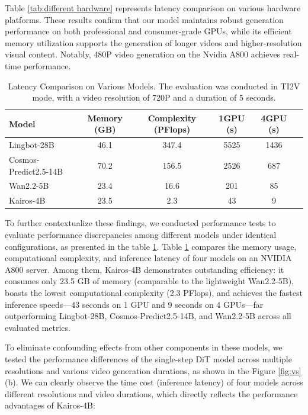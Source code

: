 \documentclass{llmxive}
\begin{document}
Table \ref{tab:different hardware} represents latency comparison on various hardware platforms. These results confirm that our model maintains robust generation performance on both professional and consumer-grade GPUs, while its efficient memory utilization supports the generation of longer videos and higher-resolution visual content. Notably, 480P video generation on the Nvidia A800 achieves real-time performance.

\begin{table}[!htbp]
\centering
\footnotesize %
\setlength{\tabcolsep}{4pt} %
\begin{tabular}{lccccc} %
\toprule
\textbf{Model}  & \textbf{Memory (GB)} & \textbf{Complexity (PFlops)} & \textbf{1GPU (s)} & \textbf{4GPU (s)} \\
\midrule
Lingbot-28B \cite{lingbot-world}  & 46.1 & 347.4 & 5525 & 1436 \\
Cosmos-Predict2.5-14B \cite{nvidia2025worldsimulationvideofoundation} & 70.2 & 156.5 & 2526 & 687 \\
Wan2.2-5B \cite{wan2025}  & 23.4 & 16.6 & 201 & 85 \\
Kairos-4B  & 23.5 & 2.3 & 43 & 9 \\
\bottomrule
\end{tabular}
\caption{Latency Comparison on Various Models. The evaluation was conducted in TI2V mode, with a video resolution of 720P and a duration of 5 seconds.}
\label{tab:cmp table}
\end{table}

To further contextualize these findings, we conducted performance tests  to evaluate performance discrepancies among different models under identical configurations, as presented in the table \ref{tab:cmp table}. Table \ref{tab:cmp table} compares the memory usage, computational complexity, and inference latency of four models on an NVIDIA A800 server. Among them, Kairos-4B demonstrates outstanding efficiency: it consumes only 23.5 GB of memory (comparable to the lightweight Wan2.2-5B), boasts the lowest computational complexity (2.3 PFlops), and achieves the fastest inference speeds—43 seconds on 1 GPU and 9 seconds on 4 GPUs—far outperforming Lingbot-28B, Cosmos-Predict2.5-14B, and Wan2.2-5B across all evaluated metrics.


To eliminate confounding effects from other components in these models, we tested the performance differences of the single-step DiT model across multiple resolutions and various video generation durations, as shown in the Figure \ref{fig:vs} (b). We can clearly observe the time cost (inference latency) of four models across different resolutions  and video durations, which directly reflects the performance advantages of Kairos-4B:
\end{document}
